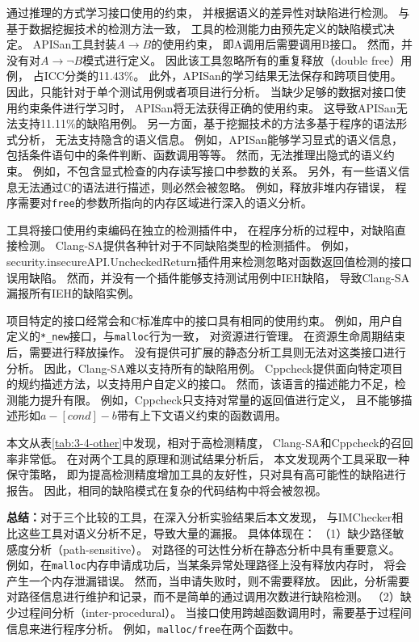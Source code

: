 {} 通过推理的方式学习接口使用的约束，
并根据语义的差异性对缺陷进行检测。
与基于数据挖掘技术的检测方法一致，
工具的检测能力由预先定义的缺陷模式决定。
APISan工具封装$A \rightarrow B$的使用约束，
即A调用后需要调用B接口。
然而，并没有对$A \rightarrow \neg B$模式进行定义。
因此该工具忽略所有的重复释放（double free）用例，
占ICC分类的11.43\%。
此外，APISan的学习结果无法保存和跨项目使用。
因此，只能针对于单个测试用例或者项目进行分析。
当缺少足够的数据对接口使用约束条件进行学习时，
APISan将无法获得正确的使用约束。
这导致APISan无法支持11.11\%的缺陷用例。
另一方面，基于挖掘技术的方法多基于程序的语法形式分析，
无法支持隐含的语义信息。
例如，APISan能够学习显式的语义信息，包括条件语句中的条件判断、函数调用等等。
然而，无法推理出隐式的语义约束。
例如，不包含显式检查的内存读写接口中参数的关系。
另外，有一些语义信息无法通过C的语法进行描述，则必然会被忽略。
例如，释放非堆内存错误，
程序需要对\texttt{free}的参数所指向的内存区域进行深入的语义分析。

{}工具将接口使用约束编码在独立的检测插件中，
在程序分析的过程中，对缺陷直接检测。
Clang-SA提供各种针对于不同缺陷类型的检测插件。
例如，security.insecureAPI.UncheckedReturn插件用来检测忽略对函数返回值检测的接口误用缺陷。
然而，并没有一个插件能够支持测试用例中IEH缺陷，
导致Clang-SA漏报所有IEH的缺陷实例。

项目特定的接口经常会和C标准库中的接口具有相同的使用约束。
例如，用户自定义的\texttt{*\_new}接口，与\texttt{malloc}行为一致，
对资源进行管理。
在资源生命周期结束后，需要进行释放操作。
没有提供可扩展的静态分析工具则无法对这类接口进行分析。
因此，Clang-SA难以支持所有的缺陷用例。
Cppcheck提供面向特定项目的规约描述方法，以支持用户自定义的接口。
然而，该语言的描述能力不足，检测能力提升有限。
例如，Cppcheck只支持对常量的返回值进行定义，
且不能够描述形如$a - [cond] - b$带有上下文语义约束的函数调用。

本文从表\ref{tab:3-4-other}中发现，相对于高检测精度，
Clang-SA和Cppcheck的召回率非常低。
在对两个工具的原理和测试结果分析后，
本文发现两个工具采取一种保守策略，
即为提高检测精度增加工具的友好性，只对具有高可能性的缺陷进行报告。
因此，相同的缺陷模式在复杂的代码结构中将会被忽视。

\noindent\textbf{总结：}对于三个比较的工具，在深入分析实验结果后本文发现，
与IMChecker相比这些工具对语义分析不足，导致大量的漏报。
具体体现在：
（1）缺少路径敏感度分析（path-sensitive）。
对路径的可达性分析在静态分析中具有重要意义。
例如，在\texttt{malloc}内存申请成功后，当某条异常处理路径上没有释放内存时，
将会产生一个内存泄漏错误。
然而，当申请失败时，则不需要释放。
因此，分析需要对路径信息进行维护和记录，而不是简单的通过调用次数进行缺陷检测。
（2）缺少过程间分析（inter-procedural）。
当接口使用跨越函数调用时，需要基于过程间信息来进行程序分析。
例如，\texttt{malloc/free}在两个函数中。


